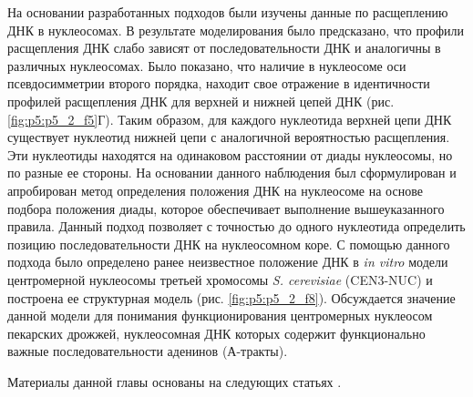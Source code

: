 На основании разработанных подходов были изучены данные по расщеплению ДНК в нуклеосомах. В результате моделирования было предсказано, что профили расщепления ДНК слабо зависят от последовательности ДНК и аналогичны в различных нуклеосомах. Было показано, что наличие в нуклеосоме оси псевдосимметрии второго порядка, находит свое отражение в идентичности профилей расщепления ДНК для верхней и нижней цепей ДНК (рис. \ref{fig:p5:p5_2_f5}Г). Таким образом, для каждого нуклеотида верхней цепи ДНК существует нуклеотид нижней цепи с аналогичной вероятностью расщепления. Эти нуклеотиды находятся на одинаковом расстоянии от диады нуклеосомы, но по разные ее стороны. На основании данного наблюдения был сформулирован и апробирован метод определения положения ДНК на нуклеосоме на основе подбора положения диады, которое обеспечивает выполнение вышеуказанного правила. Данный подход позволяет с точностью до одного нуклеотида определить позицию последовательности ДНК на нуклеосомном коре. С помощью данного подхода было определено ранее неизвестное положение ДНК в \textit{in vitro} модели центромерной нуклеосомы третьей хромосомы \textit{S. cerevisiae} (CEN3-NUC) и построена ее структурная модель (рис. \ref{fig:p5:p5_2_f8}). Обсуждается значение данной модели для понимания функционирования центромерных нуклеосом пекарских дрожжей, нуклеосомная ДНК которых содержит функционально важные последовательности аденинов (А-тракты).

Материалы данной главы основаны на следующих статьях \cite{shaytan_hydroxyl-radical_2017,shaytan_structural_2018,armeev_modeling_2016}.


